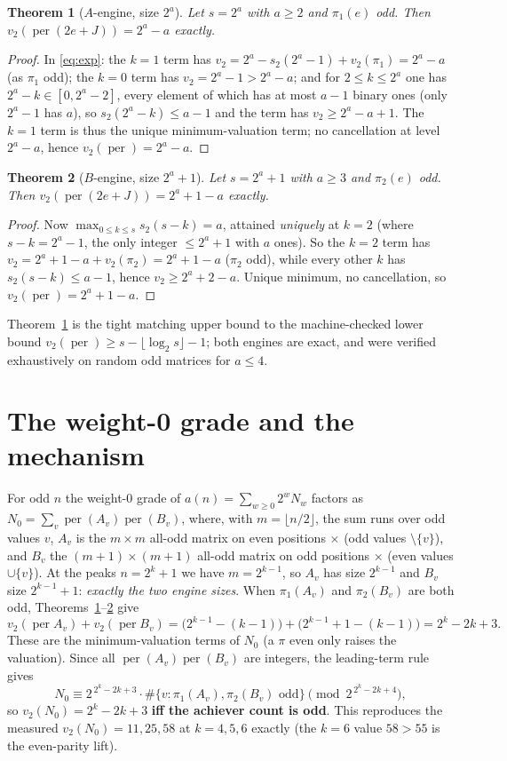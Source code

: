 \documentclass[11pt]{article}
\newtheorem{theorem}{Theorem}
\theoremstyle{remark}\newtheorem{remark}[theorem]{Remark}
\DeclareMathOperator{\perm}{per}
\newcommand{\vtwo}{v_2}
\begin{document}
\begin{theorem}[$A$-engine, size $2^a$]\label{thm:A}
Let $s=2^a$ with $a\ge2$ and $\pi_1(e)$ odd. Then $\vtwo(\perm(2e+J))=2^a-a$ exactly.
\end{theorem}
\begin{proof}
In \eqref{eq:exp}: the $k=1$ term has $\vtwo=2^a-s_2(2^a-1)+\vtwo(\pi_1)=2^a-a$ (as $\pi_1$ odd); the
$k=0$ term has $\vtwo=2^a-1>2^a-a$; and for $2\le k\le 2^a$ one has $2^a-k\in[0,2^a-2]$, every element
of which has at most $a-1$ binary ones (only $2^a-1$ has $a$), so $s_2(2^a-k)\le a-1$ and the term has
$\vtwo\ge 2^a-a+1$. The $k=1$ term is thus the unique minimum-valuation term; no cancellation at level
$2^a-a$, hence $\vtwo(\perm)=2^a-a$.
\end{proof}

\begin{theorem}[$B$-engine, size $2^a+1$]\label{thm:B}
Let $s=2^a+1$ with $a\ge3$ and $\pi_2(e)$ odd. Then $\vtwo(\perm(2e+J))=2^a+1-a$ exactly.
\end{theorem}
\begin{proof}
Now $\max_{0\le k\le s}s_2(s-k)=a$, attained \emph{uniquely} at $k=2$ (where $s-k=2^a-1$, the only
integer $\le 2^a+1$ with $a$ ones). So the $k=2$ term has $\vtwo=2^a+1-a+\vtwo(\pi_2)=2^a+1-a$
($\pi_2$ odd), while every other $k$ has $s_2(s-k)\le a-1$, hence $\vtwo\ge 2^a+2-a$. Unique minimum,
no cancellation, so $\vtwo(\perm)=2^a+1-a$.
\end{proof}

Theorem~\ref{thm:A} is the tight matching upper bound to the machine-checked lower bound
$\vtwo(\perm)\ge s-\lfloor\log_2 s\rfloor-1$; both engines are exact, and were verified exhaustively
on random odd matrices for $a\le4$.

\section{The weight-0 grade and the mechanism}

For odd $n$ the weight-$0$ grade of $a(n)=\sum_{w\ge0}2^wN_w$ factors as
$N_0=\sum_{v}\perm(A_v)\perm(B_v)$, where, with $m=\lfloor n/2\rfloor$, the sum runs over odd values
$v$, $A_v$ is the $m\times m$ all-odd matrix on even positions $\times$ (odd values $\setminus\{v\}$),
and $B_v$ the $(m{+}1)\times(m{+}1)$ all-odd matrix on odd positions $\times$ (even values
$\cup\{v\}$). At the peaks $n=2^k+1$ we have $m=2^{k-1}$, so $A_v$ has size $2^{k-1}$ and $B_v$ size
$2^{k-1}+1$: \emph{exactly the two engine sizes}. When $\pi_1(A_v)$ and $\pi_2(B_v)$ are both odd,
Theorems~\ref{thm:A}--\ref{thm:B} give
\[
   \vtwo(\perm A_v)+\vtwo(\perm B_v)
   =\big(2^{k-1}-(k-1)\big)+\big(2^{k-1}+1-(k-1)\big)=2^k-2k+3 .
\]
These are the minimum-valuation terms of $N_0$ (a $\pi$ even only raises the valuation). Since all
$\perm(A_v)\perm(B_v)$ are integers, the leading-term rule gives
\[
   N_0\equiv 2^{\,2^k-2k+3}\cdot\#\{v:\pi_1(A_v),\pi_2(B_v)\text{ odd}\}\pmod{2^{\,2^k-2k+4}},
\]
so $\vtwo(N_0)=2^k-2k+3$ \textbf{iff the achiever count is odd}. This reproduces the measured
$\vtwo(N_0)=11,25,58$ at $k=4,5,6$ exactly (the $k=6$ value $58>55$ is the even-parity lift).
\end{document}
